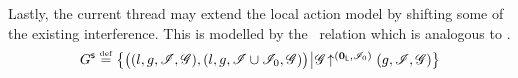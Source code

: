 
Lastly, the current thread may extend the local action model by shifting some of the existing interference. This is modelled by the \shiftG\ relation which is analogous to \shiftR.
%
\[
\shiftG \eqdef
\left\{
\begin{array}{@{} l @{\hspace*{2pt}} | @{\hspace*{2pt}} r @{}}
  \left(
  \begin{array}{@{} l @{}}
    (l, g, \lmod, \gmod),
    \left( l, g, \lmod \cup \lmod_0, \gmod  \right)
  \end{array}
  \right)
  &
  \expandsAM{\gmod}{\unitL}{\lmod_0}{g}{\lmod}{\gmod}
\end{array}
\right\}
\]

